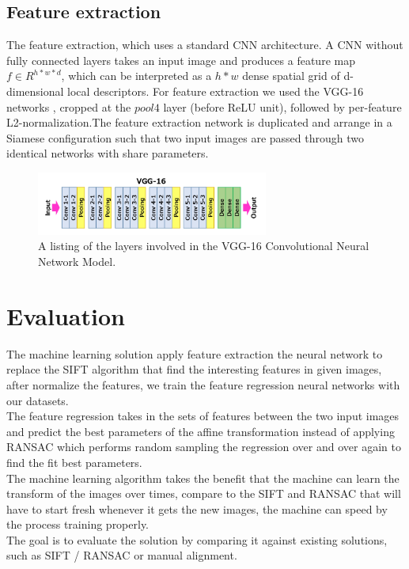 \subsection{Feature extraction}
The feature extraction, which uses a standard CNN architecture. A CNN without fully connected layers takes an input image and produces a feature map $f \in R^{h*w*d}$, which can be interpreted as a $h * w $ dense spatial grid of d-dimensional local descriptors. For feature extraction we used the VGG-16 networks \cite{simonyan2014very}, cropped at the $ pool4 $ layer (before ReLU unit), followed by per-feature L2-normalization.The feature extraction network is duplicated and arrange in a Siamese configuration such that two input images are passed through two identical networks with share parameters.
\begin{figure}
	\begin{center}
	\includegraphics[width=3.0in]{figs/vgg-16}
	\caption{A listing of the layers involved in the VGG-16 Convolutional Neural Network Model.\cite{simonyan2014very}}
	\end{center}
\end{figure}
	


\section{Evaluation}
The machine learning solution apply feature extraction the neural network to replace the SIFT algorithm that find the interesting features in given images, after normalize the features, we train the feature regression neural networks with our datasets.\\
The feature regression takes in the sets of features between the two input images and predict the best parameters of the affine transformation instead of applying RANSAC which performs random sampling the regression over and over again to find the fit best parameters.\\
The machine learning algorithm takes the benefit that the machine can learn the transform of the images over times, compare to the SIFT and RANSAC that will have to start fresh whenever it gets the new images, the machine can speed by the process  training properly.\\
The goal is to evaluate the solution by comparing it against existing solutions, such as SIFT / RANSAC or manual alignment.











